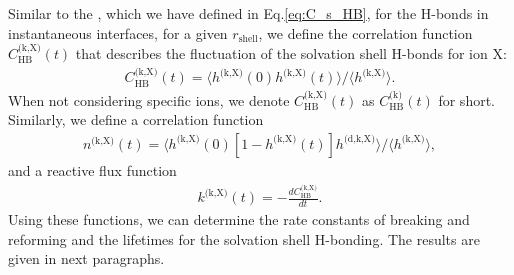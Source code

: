 Similar to the \CSHB, which we have defined in Eq.\thinspace\ref{eq:C_s_HB}, for the H-bonds in instantaneous interfaces, 
for a given $r_\text{shell}$, we define the correlation function $C^\text{(k,X)}_\text{HB}(t)$ that describes the fluctuation of the solvation shell H-bonds for ion X: 
\begin{eqnarray}
C^\text{(k,X)}_{\text{HB}}(t)=\langle h^\text{(k,X)}(0)h^\text{(k,X)}(t) \rangle/\langle h^\text{(k,X)}\rangle
\label{eq:C_k_HB}.
\end{eqnarray}
When not considering specific ions, we denote $C^\text{(k,X)}_{\text{HB}}(t)$ as $C^{\text{(k)}}_\text{HB}(t)$ for short.
%
Similarly, we define a correlation function 
\begin{eqnarray}
n^\text{(k,X)}(t)=\langle h^\text{(k,X)}(0)[1-h^\text{(k,X)}(t)]h^\text{(d,k,X)} \rangle/\langle h^\text{(k,X)}\rangle
\label{eq:n_k_HB},
\end{eqnarray}
and a reactive flux function
\begin{eqnarray}
k^\text{(k,X)}(t)= -\frac{dC_\text{HB}^\text{(k,X)}}{dt}
\label{eq:k_k_HB}.
\end{eqnarray}
Using these functions, we can determine the rate constants of breaking and reforming and the lifetimes for the solvation shell H-bonding.
The results are given in next paragraphs.
%
